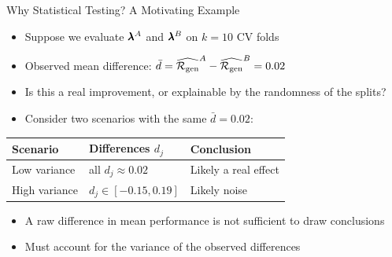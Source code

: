 \documentclass[main]{subfiles}
\begin{document}
\begin{frame}{Why Statistical Testing? A Motivating Example}

\begin{itemize}
    \item Suppose we evaluate $\pmb{\lambda}^A$ and $\pmb{\lambda}^B$ on $k=10$ CV folds
    \item Observed mean difference: $\bar{d} = \widehat{\mathcal{R}_{\text{gen}}}^A - \widehat{\mathcal{R}_{\text{gen}}}^B = 0.02$
    \item Is this a real improvement, or explainable by the randomness of the splits?
\end{itemize}

\begin{itemize}
    \item Consider two scenarios with the same $\bar{d}=0.02$:
\end{itemize}

\begin{center}
\begin{tabular}{lll}
     \toprule
     Scenario & Differences $d_j$ & Conclusion\\
     \midrule
     Low variance & all $d_j \approx 0.02$ & Likely a real effect\\
     High variance & $d_j \in \left[ -0.15, 0.19 \right]$ & Likely noise \\
     \bottomrule
\end{tabular}
\end{center}

\begin{itemize}
    \item A raw difference in mean performance is not sufficient to draw conclusions
    \item Must account for the variance of the observed differences
\end{itemize}

\end{frame}
\end{document}
